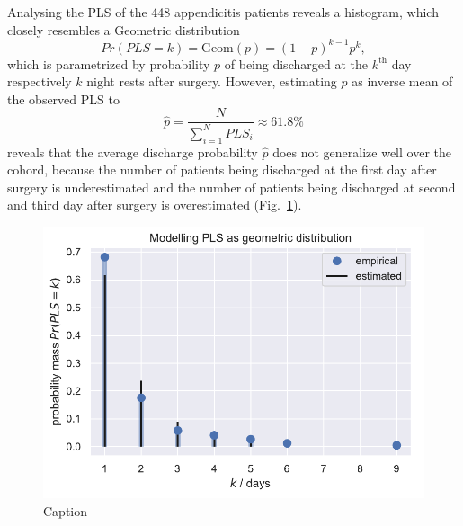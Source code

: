 Analysing the PLS of the 448 appendicitis patients reveals a histogram, which closely resembles a Geometric distribution
\begin{equation}
Pr(PLS=k) = \text{Geom}(p) = (1-p)^{k-1}p^{k},
\end{equation}
which is parametrized by probability $p$ of being discharged at the $k^\text{th}$ day respectively $k$ night rests after surgery. 
However, estimating $p$ as inverse mean of the observed PLS to 
\begin{equation}
 \hat{p} = \frac{N}{\sum\limits_{i=1}^N PLS_i} \approx 61.8\%	
\end{equation}
reveals that the average discharge probability $\hat{p}$ does not generalize well over the cohord, because the number of patients being discharged at the first day after surgery is underestimated and the number of patients being discharged at second and third day after surgery is overestimated (Fig.~\ref{fig:Geom}).

\begin{figure}
    \centering
    \includegraphics{images/DS19eH1_G0__empirical_geometric.pdf}
    \caption{Caption}
    \label{fig:Geom}
\end{figure}

